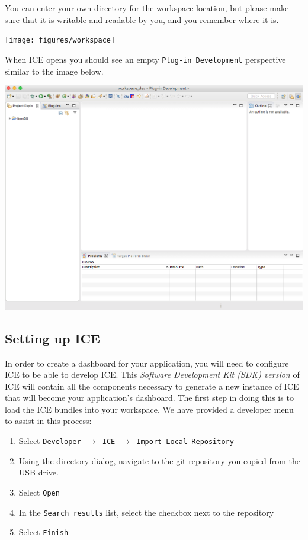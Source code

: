 You can enter your own directory for the workspace location, but please make sure that it is writable and readable by you, and you remember where it is.
\begin{center} \texttt{[image: figures/workspace]}
\end{center}
When ICE opens you should see an empty \texttt{Plug-in Development} perspective
similar to the image below.
\begin{center} \includegraphics[width=\textwidth]{figures/expectedICE}
\end{center} 

\subsection{Setting up ICE}
In order to create a dashboard for your application, you will need to configure ICE to
be able to develop ICE. This \textit{Software Development Kit (SDK) version} of
ICE will contain all the components necessary to generate a new instance of ICE that will become your application's dashboard. 
The first step in doing this is to load the ICE bundles into
your workspace. We have provided a developer menu to assist in this process:

\begin{enumerate}
\item Select \texttt{Developer $\rightarrow$ ICE $\rightarrow$
Import Local Repository}
\item Using the directory dialog, navigate to the git repository you copied
from the USB drive.
\item Select \texttt{Open}
\item In the \texttt{Search results} list, select the checkbox next to the
repository
\item Select \texttt{Finish}
\end{enumerate}

